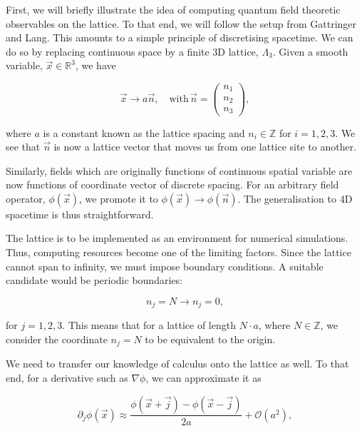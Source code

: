 \documentclass{article}
\numberwithin{equation}{section} %
\begin{document}
First, we will briefly illustrate the idea of computing quantum field theoretic observables on the lattice. To that end, we will follow the setup from Gattringer and Lang\cite{lattice}. This amounts to a simple principle of discretising spacetime. We can do so by replacing continuous space by a finite 3D lattice, $\Lambda_3$. Given a smooth variable, $\vec{x}\in\mathbb{R}^3$, we have

\begin{equation}
\vec{x} \rightarrow a \vec{n}, \quad \mathrm{with } \, \vec{n} = \begin{pmatrix}
n_1 \\ n_2 \\ n_3
\end{pmatrix},
\end{equation}

\noindent where $a$ is a constant known as the lattice spacing and $n_i\in\mathbb{Z}$ for $i=1,2,3$. We see that $\vec{n}$ is now a lattice vector that moves us from one lattice site to another. 

Similarly, fields which are originally functions of continuous spatial variable are now functions of coordinate vector of discrete spacing. For an arbitrary field operator, $\phi(\vec{x})$, we promote it to $\phi(\vec{x}) \rightarrow \phi(\vec{n})$. The generalisation to 4D spacetime is thus straightforward.

The lattice is to be implemented as an environment for numerical simulations. Thus, computing resources become one of the limiting factors. Since the lattice cannot span to infinity, we must impose boundary conditions. A suitable candidate would be periodic boundaries:

\begin{equation}
n_j=N \rightarrow n_j=0,
\end{equation}

\noindent for $j=1,2,3$. This means that for a lattice of length $N\cdot a$, where $N\in\mathbb{Z}$, we consider the coordinate $n_j=N$ to be equivalent to the origin.

We need to transfer our knowledge of calculus onto the lattice as well. To that end, for a derivative such as $\nabla\phi$, we can approximate it as

\begin{equation}
\partial_j\phi(\vec{x}) \approx \frac{\phi(\vec{x}+\vec{j})-\phi(\vec{x}-\vec{j})}{2a} + \mathcal{O}(a^2),
\label{lattice derivative}
\end{equation}
\end{document}
